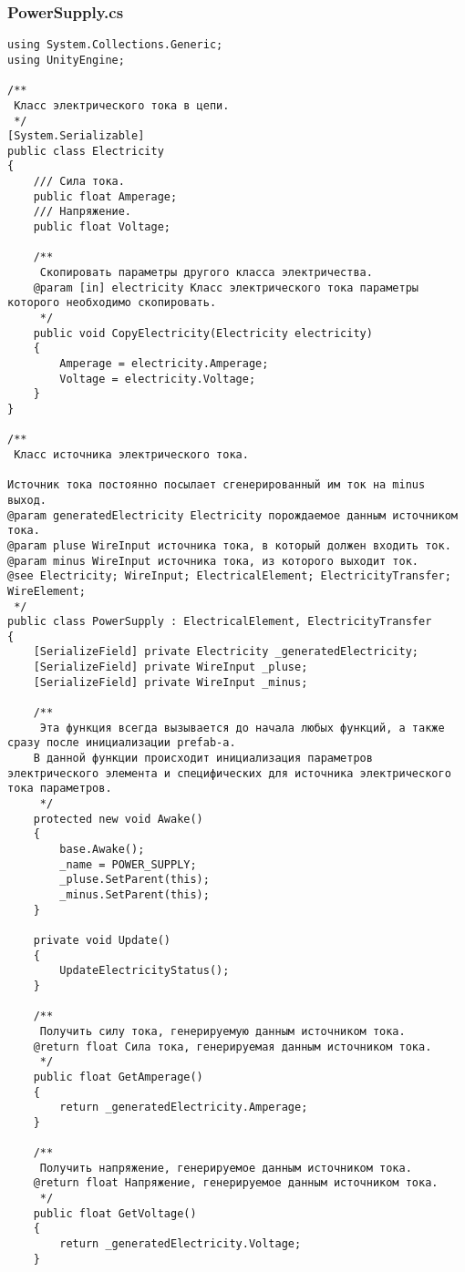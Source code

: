 \subsubsection*{PowerSupply.cs}
\begin{verbatim}
﻿using System.Collections.Generic;
using UnityEngine;

/**
 Класс электрического тока в цепи.
 */
[System.Serializable]
public class Electricity
{
    /// Сила тока.
    public float Amperage;
    /// Напряжение.
    public float Voltage;

    /**
     Скопировать параметры другого класса электричества.
    @param [in] electricity Класс электрического тока параметры которого необходимо скопировать.
     */
    public void CopyElectricity(Electricity electricity)
    {
        Amperage = electricity.Amperage;
        Voltage = electricity.Voltage;
    }
}

/**
 Класс источника электрического тока.

Источник тока постоянно посылает сгенерированный им ток на minus выход.
@param generatedElectricity Electricity порождаемое данным источником тока.
@param pluse WireInput источника тока, в который должен входить ток.
@param minus WireInput источника тока, из которого выходит ток.
@see Electricity; WireInput; ElectricalElement; ElectricityTransfer; WireElement;
 */
public class PowerSupply : ElectricalElement, ElectricityTransfer
{
    [SerializeField] private Electricity _generatedElectricity;
    [SerializeField] private WireInput _pluse;
    [SerializeField] private WireInput _minus;

    /**
     Эта функция всегда вызывается до начала любых функций, а также сразу после инициализации prefab-а.
    В данной функции происходит инициализация параметров электрического элемента и специфических для источника электрического тока параметров.
     */
    protected new void Awake()
    {
        base.Awake();
        _name = POWER_SUPPLY;
        _pluse.SetParent(this);
        _minus.SetParent(this);
    }

    private void Update()
    {
        UpdateElectricityStatus();
    }

    /**
     Получить силу тока, генерируемую данным источником тока.
    @return float Сила тока, генерируемая данным источником тока.
     */
    public float GetAmperage()
    {
        return _generatedElectricity.Amperage;
    }

    /**
     Получить напряжение, генерируемое данным источником тока.
    @return float Напряжение, генерируемое данным источником тока.
     */
    public float GetVoltage()
    {
        return _generatedElectricity.Voltage;
    }


\end{verbatim}
